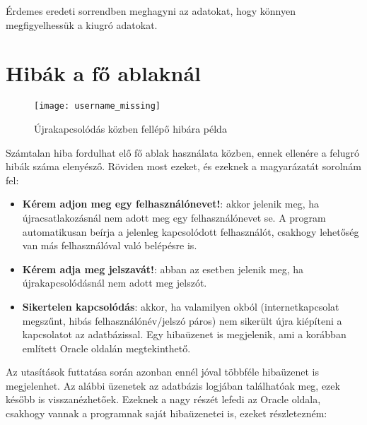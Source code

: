 Érdemes eredeti sorrendben meghagyni az adatokat, hogy könnyen megfigyelhessük a kiugró adatokat.

\section{Hibák a fő ablaknál}

\begin{figure}[ht]
  \begin{center}
  \texttt{[image: username\_missing]}
  \end{center}
 \caption{Újrakapcsolódás közben fellépő hibára példa}
\end{figure}

Számtalan hiba fordulhat elő fő ablak használata közben, ennek ellenére a felugró hibák száma elenyésző.
Röviden most ezeket, és ezeknek a magyarázatát sorolnám fel:

\begin{itemize}
  \item \textbf{Kérem adjon meg egy felhasználónevet!}: akkor jelenik meg, ha újracsatlakozásnál nem adott meg
  egy felhasználónevet se. A program automatikusan beírja a jelenleg kapcsolódott felhasználót, csakhogy lehetőség van más felhasználóval való
  belépésre is.
  \item \textbf{Kérem adja meg jelszavát!}: abban az esetben jelenik meg, ha újrakapcsolódásnál nem adott meg jelszót.
  \item \textbf{Sikertelen kapcsolódás}: akkor, ha valamilyen okból (internetkapcsolat megszűnt, hibás felhasználónév/jelszó páros) nem sikerült
  újra kiépíteni a kapcsolatot az adatbázissal. Egy hibaüzenet is megjelenik, ami a korábban említett Oracle oldalán\cite{oracledocs} megtekinthető.
\end{itemize}

Az utasítások futtatása során azonban ennél jóval többféle hibaüzenet is megjelenhet. Az alábbi üzenetek az adatbázis logjában találhatóak meg, ezek később is visszanézhetőek.
Ezeknek a nagy részét lefedi az Oracle oldala\cite{oracledocs}, csakhogy
vannak a programnak saját hibaüzenetei is, ezeket részletezném:

